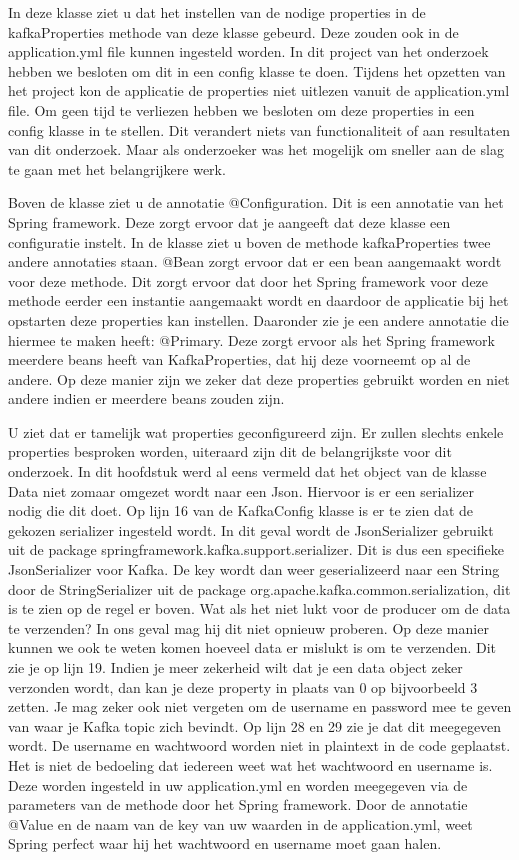      In deze klasse ziet u dat het instellen van de nodige properties in de kafkaProperties methode van deze klasse gebeurd. Deze zouden ook in de application.yml file kunnen ingesteld worden. In dit project van het onderzoek hebben we besloten om dit in een config klasse te doen. Tijdens het opzetten van het project kon de applicatie de properties niet uitlezen vanuit de application.yml file. Om geen tijd te verliezen hebben we besloten om deze properties in een config klasse in te stellen. Dit verandert niets van functionaliteit of aan resultaten van dit onderzoek. Maar als onderzoeker was het mogelijk om sneller aan de slag te gaan met het belangrijkere werk.
     
     Boven de klasse ziet u de annotatie @Configuration. Dit is een annotatie van het Spring framework. Deze zorgt ervoor dat je aangeeft dat deze klasse een configuratie instelt. In de klasse ziet u boven de methode kafkaProperties twee andere annotaties staan. @Bean zorgt ervoor dat er een bean aangemaakt wordt voor deze methode. Dit zorgt ervoor dat door het Spring framework voor deze methode eerder een instantie aangemaakt wordt en daardoor de applicatie bij het opstarten deze properties kan instellen. Daaronder zie je een andere annotatie die hiermee te maken heeft: @Primary. Deze zorgt ervoor als het Spring framework meerdere beans heeft van KafkaProperties, dat hij deze voorneemt op al de andere. Op deze manier zijn we zeker dat deze properties gebruikt worden en niet andere indien er meerdere beans zouden zijn.
     
     U ziet dat er tamelijk wat properties geconfigureerd zijn. Er zullen slechts enkele properties besproken worden, uiteraard zijn dit de belangrijkste voor dit onderzoek. In dit hoofdstuk werd al eens vermeld dat het object van de klasse Data niet zomaar omgezet wordt naar een Json. Hiervoor is er een serializer nodig die dit doet. Op lijn 16 van de KafkaConfig klasse is er te zien dat de gekozen serializer ingesteld wordt. In dit geval wordt de JsonSerializer gebruikt uit de package springframework.kafka.support.serializer. Dit is dus een specifieke JsonSerializer voor Kafka. De key wordt dan weer geserializeerd naar een String door de StringSerializer uit de package org.apache.kafka.common.serialization, dit is te zien op de regel er boven. Wat als het niet lukt voor de producer om de data te verzenden? In ons geval mag hij dit niet opnieuw proberen. Op deze manier kunnen we ook te weten komen hoeveel data er mislukt is om te verzenden. Dit zie je op lijn 19. Indien je meer zekerheid wilt dat je een data object zeker verzonden wordt, dan kan je deze property in plaats van 0 op bijvoorbeeld 3 zetten. Je mag zeker ook niet vergeten om de username en password mee te geven van waar je Kafka topic zich bevindt. Op lijn 28 en 29 zie je dat dit meegegeven wordt. De username en wachtwoord worden niet in plaintext in de code geplaatst. Het is niet de bedoeling dat iedereen weet wat het wachtwoord en username is. Deze worden ingesteld in uw application.yml en worden meegegeven via de parameters van de methode door het Spring framework. Door de annotatie @Value en de naam van de key van uw waarden in de application.yml, weet Spring perfect waar hij het wachtwoord en username moet gaan halen.
     
